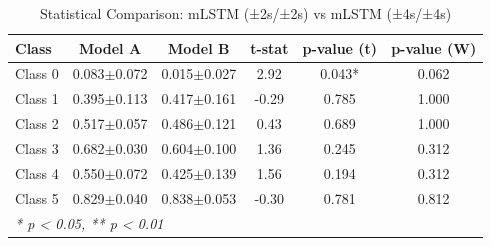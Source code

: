 \begin{table}[htbp]
\centering
\caption{Statistical Comparison: mLSTM (±2s/±2s) vs mLSTM (±4s/±4s)}
\label{tab:comparison_class_mlstm_±2s_±2s_vs_mlstm_±4s_±4s}
\begin{tabular}{lccccc}
\toprule
\textbf{Class} & \textbf{Model A} & \textbf{Model B} & \textbf{t-stat} & \textbf{p-value (t)} & \textbf{p-value (W)} \\
\midrule
Class 0 & 0.083$\pm$0.072 & 0.015$\pm$0.027 & 2.92 & 0.043* & 0.062 \\
Class 1 & 0.395$\pm$0.113 & 0.417$\pm$0.161 & -0.29 & 0.785 & 1.000 \\
Class 2 & 0.517$\pm$0.057 & 0.486$\pm$0.121 & 0.43 & 0.689 & 1.000 \\
Class 3 & 0.682$\pm$0.030 & 0.604$\pm$0.100 & 1.36 & 0.245 & 0.312 \\
Class 4 & 0.550$\pm$0.072 & 0.425$\pm$0.139 & 1.56 & 0.194 & 0.312 \\
Class 5 & 0.829$\pm$0.040 & 0.838$\pm$0.053 & -0.30 & 0.781 & 0.812 \\
\bottomrule
\multicolumn{6}{l}{\textit{* p < 0.05, ** p < 0.01}} \\
\end{tabular}
\end{table}